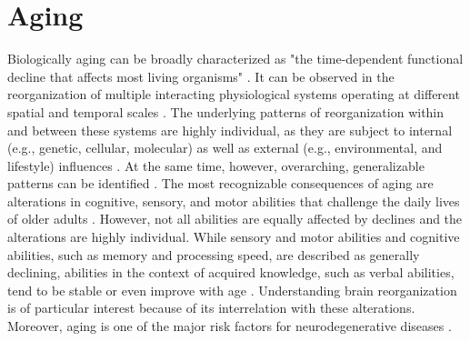 
\section{Aging}
\label{theory:aging}
Biologically aging can be broadly characterized as "the time-dependent functional decline that affects most living organisms" \cite{López-Otín2013}. It can be observed in the reorganization of multiple interacting physiological systems operating at different spatial and temporal scales \cite{Mooney2016}. The underlying patterns of reorganization within and between these systems are highly individual, as they are subject to internal (e.g., genetic, cellular, molecular) as well as external (e.g., environmental, and lifestyle) influences \cite{Smith2020, Mooney2016, Cohen2022}. At the same time, however, overarching, generalizable patterns can be identified \cite{Salthouse2019}. The most recognizable consequences of aging are alterations in cognitive, sensory, and motor abilities that challenge the daily lives of older adults \cite{Li2002}. However, not all abilities are equally affected by declines and the alterations are highly individual. While sensory and motor abilities and cognitive abilities, such as memory and processing speed, are described as generally declining, abilities in the context of acquired knowledge, such as verbal abilities, tend to be stable or even improve with age \cite{Park2009}. Understanding brain reorganization is of particular interest because of its interrelation with these alterations. Moreover, aging is one of the major risk factors for neurodegenerative diseases \cite{Hou2019}.

